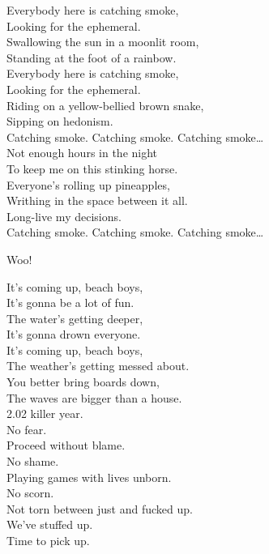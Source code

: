 Everybody here is catching smoke, \\
Looking for the ephemeral. \\
Swallowing the sun in a moonlit room, \\
Standing at the foot of a rainbow. \\
Everybody here is catching smoke, \\
Looking for the ephemeral. \\
Riding on a yellow-bellied brown snake, \\
Sipping on hedonism. \\

Catching smoke. Catching smoke. Catching smoke… \\

Not enough hours in the night \\
To keep me on this stinking horse. \\
Everyone's rolling up pineapples, \\
Writhing in the space between it all. \\
Long-live my decisions. \\

Catching smoke. Catching smoke. Catching smoke… \\





Woo!

It's coming up, beach boys, \\
It's gonna be a lot of fun. \\
The water's getting deeper, \\
It's gonna drown everyone. \\
It's coming up, beach boys, \\
The weather's getting messed about. \\
You better bring boards down, \\
The waves are bigger than a house. \\

2.02 killer year. \\
No fear. \\
Proceed without blame. \\
No shame. \\
Playing games with lives unborn. \\
No scorn. \\
Not torn between just and fucked up. \\
We've stuffed up. \\
Time to pick up. \\

